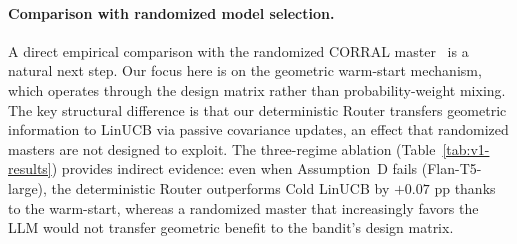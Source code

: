 \paragraph{Comparison with randomized model selection.}
A direct empirical comparison with the randomized CORRAL master~\cite{agarwal2017corralling} is a natural next step. Our focus here is on the geometric warm-start mechanism, which operates through the design matrix rather than probability-weight mixing. The key structural difference is that our deterministic Router transfers geometric information to LinUCB via passive covariance updates, an effect that randomized masters are not designed to exploit. The three-regime ablation (Table~\ref{tab:v1-results}) provides indirect evidence: even when Assumption~D fails (Flan-T5-large), the deterministic Router outperforms Cold LinUCB by $+0.07$ pp thanks to the warm-start, whereas a randomized master that increasingly favors the LLM would not transfer geometric benefit to the bandit's design matrix.


\clearpage
